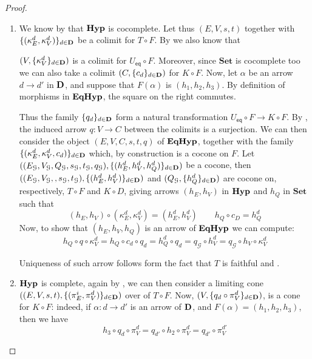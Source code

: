 \documentclass[a4paper,UKenglish,cleveref,pdftex,thm-restate,numberwithinsect]{lipics-v2021}
\newcommand{\eq}{\mathsf{eq}}
\newcommand{\Set}{\mathbf{Set}}
\def\D{\textbf {\textup{D}}}
\newcommand{\catname}[1]{\textbf{\textup{#1}}}
\newcommand{\hyp}{\catname{Hyp}}
\newcommand{\EqHyp}{\catname{EqHyp}} %
\begin{document}
\begin{proof}\label{proof:comp}
	\begin{enumerate}
		\item We know by  that $\hyp$ is cocomplete. Let thus $(E, V, s, t)$ together with $\{(\kappa_E^d, \kappa_V^d)\}_{d \in \D}$ be a colimit for $T \circ F$. By  we also know that 
		 
		 \noindent 
		 \parbox{10.5cm}{$(V, \{\kappa^d_V\}_{d\in \D})$ is a colimit for $U_\eq\circ F$. Moreover, since $\Set$ is cocomplete too we can also take a colimit $(C, \{c_d\}_{d\in \D})$ for $K\circ F$. Now,  let $\alpha$ be an arrow $d\to d'$ in $\D$, and suppose that $F(\alpha)$ is $(h_1, h_2, h_3)$. By definition of morphisms in $\EqHyp$, the square on the right commutes.}
		\hfill 
		\parbox{2cm}{}
		
		Thus the family $\{q_d\}_{d\in \D}$ form a natural transformation $U_\eq\circ F\to K\circ F$.  By , the induced arrow $q: V \to C$ between the colimits is a surjection.  We can then consider the object $(E, V, C, s, t, q)$ of $\EqHyp$, together with the family  $\{(\kappa_E^d, \kappa_V^d, c_d)\}_{d\in \D}$ which, by construction is a cocone on $F$. Let $((E_\mathcal{G},V_\mathcal{G}, Q_{\mathcal{G}}, s_{\mathcal{G}}, t_{\mathcal{G}}, q_{\mathcal{G}}), \{(h^d_E, h^d_V, h^d_Q)\}_{d\in \D})$ be a cocone, then $((E_\mathcal{G},V_\mathcal{G},, s_{\mathcal{G}}, t_{\mathcal{G}}), \{(h^d_E, h^d_V)\}_{d\in \D})$ and $(Q_{\mathcal{G}}, \{h^d_Q\}_{d\in \D})$ are cocone on, respectively, $T\circ F$ and $K\circ D$, giving arrows $(h_E, h_V)$ in $\hyp$ and $h_Q$ in $\Set$ such that
		\[(h_E, h_V)\circ (\kappa_E^d, \kappa_V^d)=(h^d_E, h^d_V) \qquad h_Q\circ c_D=h^d_Q\]
		Now, to show that $(h_E, h_V, h_Q)$ is an arrow of $\EqHyp$ we can compute:
		\[h_Q\circ q\circ \kappa^d_V=h_Q\circ c_d\circ q_d=h^d_Q\circ q_d=q_{\mathcal{G}} \circ h^d_V=q_{\mathcal{G}}\circ h_V\circ \kappa^d_V \]
		
		Uniqueness of such arrow follows form the fact that $T$ is faithful and .
		
		\item   $\hyp$ is complete, again by , we can then consider a limiting cone $((E, V, s, t), \{(\pi^i_E, \pi^d_V)\}_{d\in \D})$ over of $T \circ F$. Now, $(V, \{q_d\circ \pi_V^d\}_{d\in \D})$, is a cone for $K \circ F$: indeed, if $\alpha: d \to d'$ is an arrow of $\D$, and $F(\alpha)=(h_1, h_2, h_3)$, then we have
	\[h_3\circ q_d\circ \pi^d_V =q_{d'} \circ h_2\circ \pi^d_{V}=q_{d'}\circ \pi^{d'}_V\]


\end{enumerate}
\end{proof}
\end{document}
